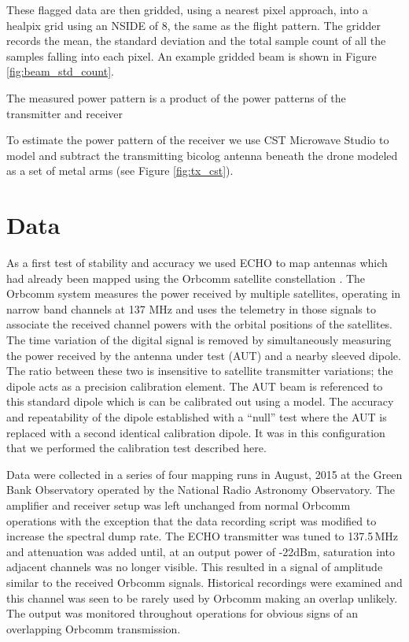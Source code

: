 \documentclass[preprint2,numberedappendix,tighten,twocolappendix]{aastex6}
\begin{document}
These flagged data are then gridded, using a nearest pixel approach, into a healpix grid using an NSIDE of 8, the same as the flight pattern.  The gridder records the mean, the standard deviation and the total sample count of all the samples falling into each pixel. An example gridded beam is shown in Figure \ref{fig:beam_std_count}.

The measured power pattern is a product of the power patterns of the transmitter and receiver

  To estimate the power pattern of the receiver we use CST Microwave Studio to model and subtract the transmitting bicolog antenna beneath the drone modeled as a set of metal arms (see Figure \ref{fig:tx_cst}).




\section{Data}
As a first test of stability and accuracy we used ECHO to map antennas which had already been mapped using the Orbcomm satellite constellation .  The Orbcomm system measures the power received by multiple satellites, operating in narrow band channels at 137 MHz and uses the telemetry in those signals to associate the received channel powers with the orbital positions of the satellites.   The time variation of the digital signal is removed by simultaneously measuring the power received by the antenna under test (AUT) and a nearby sleeved dipole. The ratio between these two is insensitive to satellite transmitter variations; the dipole acts as a precision calibration element. The AUT beam is referenced to this standard dipole which is can be calibrated out using a model.  The accuracy and repeatability of the dipole established with a ``null'' test where the AUT is replaced with a second identical calibration dipole.  It was in this configuration that we performed the calibration test described here.


Data were collected in a series of four mapping runs in August, 2015 at the Green Bank Observatory operated by the National Radio Astronomy Observatory.  The amplifier and receiver setup was left unchanged from normal Orbcomm operations with the exception that the data recording script was modified to increase the spectral dump rate. The ECHO transmitter was tuned to 137.5\,MHz and attenuation was added until, at an output power of -22dBm, saturation into adjacent channels was no longer visible.  This resulted in a signal of amplitude similar to the received Orbcomm signals. Historical recordings were examined and this channel was seen to be rarely used by Orbcomm making an overlap unlikely.  The output was monitored throughout operations for obvious signs of an overlapping Orbcomm transmission.
\end{document}
